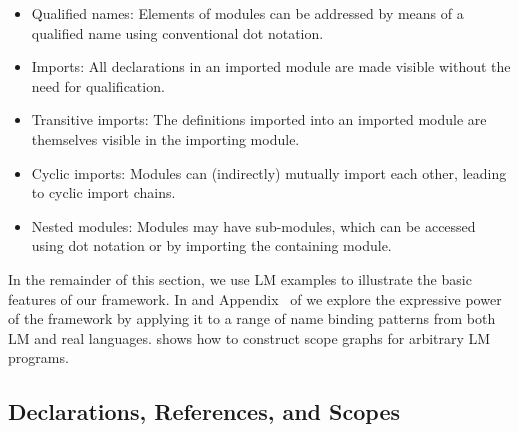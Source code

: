 \begin{itemize}
  \item Qualified names: Elements of modules can be addressed by means of a
  qualified name using conventional dot notation. 
  \item Imports: All declarations in an imported module are made visible without 
    the need for qualification.
  \item Transitive imports: The definitions imported into an imported module are
  themselves visible in the importing module.
  \item Cyclic imports: Modules can (indirectly) mutually import each other,
  leading to cyclic import chains.
  \item Nested modules: Modules may have sub-modules, which can be accessed using
  dot notation or by importing the containing module.
\end{itemize}



\noindent
In the remainder of this section, we use LM examples to illustrate the basic
features of our framework.  In  and 
Appendix ~of \cite{TUD-SERG-2015-001-local} we explore the expressive
power of the framework by applying it to a range of name binding patterns
from both LM and real languages.
 shows how to 
construct scope graphs for arbitrary LM programs. 

\subsection{Declarations, References, and Scopes}

